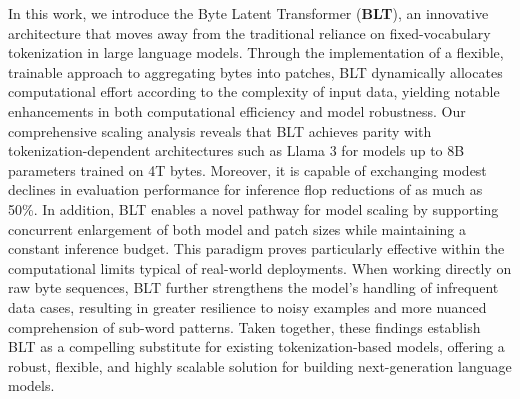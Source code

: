 In this work, we introduce the Byte Latent Transformer (\textbf{BLT}), an innovative architecture that moves away from the traditional reliance on fixed-vocabulary tokenization in large language models. Through the implementation of a flexible, trainable approach to aggregating bytes into patches, {\textsc BLT} dynamically allocates computational effort according to the complexity of input data, yielding notable enhancements in both computational efficiency and model robustness. Our comprehensive scaling analysis reveals that {\textsc BLT} achieves parity with tokenization-dependent architectures such as Llama 3 for models up to 8B parameters trained on 4T bytes. Moreover, it is capable of exchanging modest declines in evaluation performance for inference flop reductions of as much as 50\%. In addition, {\textsc BLT} enables a novel pathway for model scaling by supporting concurrent enlargement of both model and patch sizes while maintaining a constant inference budget. This paradigm proves particularly effective within the computational limits typical of real-world deployments. When working directly on raw byte sequences, {\textsc BLT} further strengthens the model’s handling of infrequent data cases, resulting in greater resilience to noisy examples and more nuanced comprehension of sub-word patterns. Taken together, these findings establish {\textsc BLT} as a compelling substitute for existing tokenization-based models, offering a robust, flexible, and highly scalable solution for building next-generation language models.

